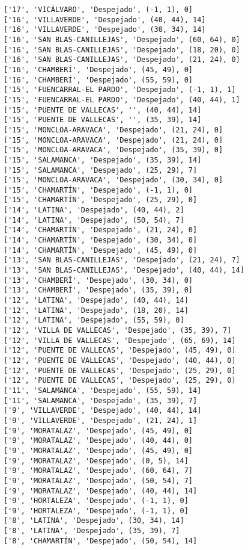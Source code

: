 \documentclass[11pt]{article}
\begin{document}
\begin{Verbatim}[commandchars=\\\{\}]
['17', 'VICÁLVARO', 'Despejado', (-1, 1), 0]
['16', 'VILLAVERDE', 'Despejado', (40, 44), 14]
['16', 'VILLAVERDE', 'Despejado', (30, 34), 14]
['16', 'SAN BLAS-CANILLEJAS', 'Despejado', (60, 64), 0]
['16', 'SAN BLAS-CANILLEJAS', 'Despejado', (18, 20), 0]
['16', 'SAN BLAS-CANILLEJAS', 'Despejado', (21, 24), 0]
['16', 'CHAMBERÍ', 'Despejado', (45, 49), 0]
['16', 'CHAMBERÍ', 'Despejado', (55, 59), 0]
['15', 'FUENCARRAL-EL PARDO', 'Despejado', (-1, 1), 1]
['15', 'FUENCARRAL-EL PARDO', 'Despejado', (40, 44), 1]
['15', 'PUENTE DE VALLECAS', '', (40, 44), 14]
['15', 'PUENTE DE VALLECAS', '', (35, 39), 14]
['15', 'MONCLOA-ARAVACA', 'Despejado', (21, 24), 0]
['15', 'MONCLOA-ARAVACA', 'Despejado', (21, 24), 0]
['15', 'MONCLOA-ARAVACA', 'Despejado', (35, 39), 0]
['15', 'SALAMANCA', 'Despejado', (35, 39), 14]
['15', 'SALAMANCA', 'Despejado', (25, 29), 7]
['15', 'MONCLOA-ARAVACA', 'Despejado', (30, 34), 0]
['15', 'CHAMARTÍN', 'Despejado', (-1, 1), 0]
['15', 'CHAMARTÍN', 'Despejado', (25, 29), 0]
['14', 'LATINA', 'Despejado', (40, 44), 2]
['14', 'LATINA', 'Despejado', (50, 54), 7]
['14', 'CHAMARTÍN', 'Despejado', (21, 24), 0]
['14', 'CHAMARTÍN', 'Despejado', (30, 34), 0]
['14', 'CHAMARTÍN', 'Despejado', (45, 49), 0]
['13', 'SAN BLAS-CANILLEJAS', 'Despejado', (21, 24), 7]
['13', 'SAN BLAS-CANILLEJAS', 'Despejado', (40, 44), 14]
['13', 'CHAMBERÍ', 'Despejado', (30, 34), 0]
['13', 'CHAMBERÍ', 'Despejado', (35, 39), 0]
['12', 'LATINA', 'Despejado', (40, 44), 14]
['12', 'LATINA', 'Despejado', (18, 20), 14]
['12', 'LATINA', 'Despejado', (55, 59), 0]
['12', 'VILLA DE VALLECAS', 'Despejado', (35, 39), 7]
['12', 'VILLA DE VALLECAS', 'Despejado', (65, 69), 14]
['12', 'PUENTE DE VALLECAS', 'Despejado', (45, 49), 0]
['12', 'PUENTE DE VALLECAS', 'Despejado', (40, 44), 0]
['12', 'PUENTE DE VALLECAS', 'Despejado', (25, 29), 0]
['12', 'PUENTE DE VALLECAS', 'Despejado', (25, 29), 0]
['11', 'SALAMANCA', 'Despejado', (55, 59), 14]
['11', 'SALAMANCA', 'Despejado', (35, 39), 7]
['9', 'VILLAVERDE', 'Despejado', (40, 44), 14]
['9', 'VILLAVERDE', 'Despejado', (21, 24), 1]
['9', 'MORATALAZ', 'Despejado', (45, 49), 0]
['9', 'MORATALAZ', 'Despejado', (40, 44), 0]
['9', 'MORATALAZ', 'Despejado', (45, 49), 0]
['9', 'MORATALAZ', 'Despejado', (0, 5), 14]
['9', 'MORATALAZ', 'Despejado', (60, 64), 7]
['9', 'MORATALAZ', 'Despejado', (50, 54), 7]
['9', 'MORATALAZ', 'Despejado', (40, 44), 14]
['9', 'HORTALEZA', 'Despejado', (-1, 1), 0]
['9', 'HORTALEZA', 'Despejado', (-1, 1), 0]
['8', 'LATINA', 'Despejado', (30, 34), 14]
['8', 'LATINA', 'Despejado', (35, 39), 7]
['8', 'CHAMARTÍN', 'Despejado', (50, 54), 14]

\end{Verbatim}
\end{document}

